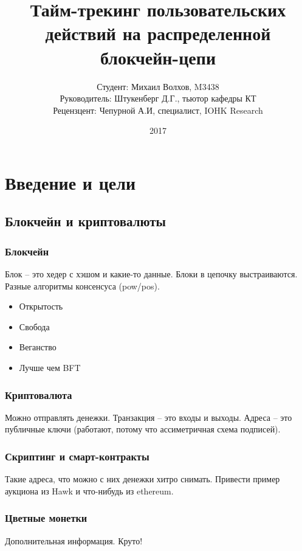 \documentclass[11pt,handout,pdf,hyperref={unicode}]{beamer}
\title[Тайм-трекинг на блокчейне]{Тайм-трекинг пользовательских действий на распределенной блокчейн-цепи}
\begin{document}
\author[Михаил Волхов, M3438]{
  Студент: Михаил Волхов, M3438\\
  Руководитель: Штукенберг Д.Г., тьютор кафедры КТ \\
  Рецензцент: Чепурной А.И, специалист, IOHK Research
}
\date{2017}

\frame{\titlepage}

\section{Введение и цели}

\subsection{Блокчейн и криптовалюты}

\begin{frame}
  \frametitle{Блокчейн}

  Блок -- это хедер с хэшом и какие-то данные. Блоки в цепочку
  выстраиваются. Разные алгоритмы консенсуса (pow/pos).
  \begin{itemize}
  \item Открытость
  \item Свобода
  \item Веганство
  \item Лучше чем BFT
  \end{itemize}
\end{frame}

\begin{frame}
  \frametitle{Криптовалюта}

  Можно отправлять денежки. Транзакция -- это входы и выходы. Адреса
  -- это публичные ключи (работают, потому что ассиметричная схема
  подписей).
\end{frame}

\begin{frame}
  \frametitle{Скриптинг и смарт-контракты}

  Такие адреса, что можно с них денежки хитро снимать. Привести пример аукциона из Hawk и что-нибудь из ethereum.
\end{frame}

\begin{frame}
  \frametitle{Цветные монетки}

  Дополнительная информация. Круто!
\end{frame}
\end{document}
